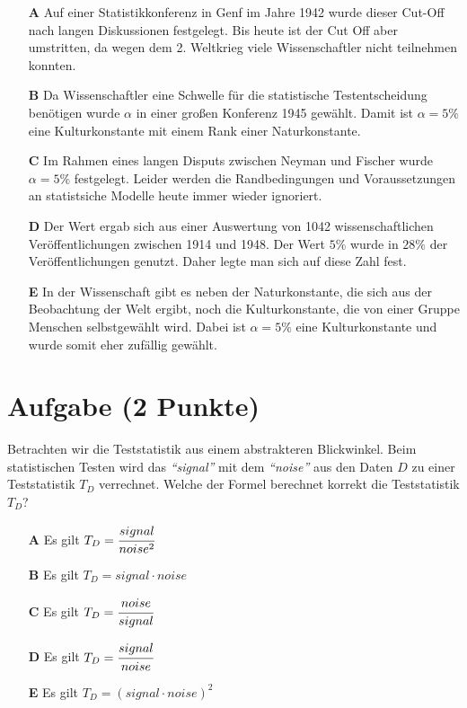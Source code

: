 \documentclass[a4paper, 9pt]{scrartcl}\usepackage[]{graphicx}\usepackage[]{xcolor}
\begin{document}
\begin{enumerate}
\item [\textbf{A} \msquare] Auf einer Statistikkonferenz in Genf im Jahre 1942 wurde dieser Cut-Off nach langen Diskussionen festgelegt. Bis heute ist der Cut Off aber umstritten, da wegen dem 2. Weltkrieg viele Wissenschaftler nicht teilnehmen konnten.
\item [\textbf{B} \msquare] Da Wissenschaftler eine Schwelle für die statistische Testentscheidung benötigen wurde $\alpha$ in einer großen Konferenz 1945 gewählt. Damit ist $\alpha = 5\%$ eine Kulturkonstante mit einem Rank einer Naturkonstante.
\item [\textbf{C} \msquare] Im Rahmen eines langen Disputs zwischen Neyman und Fischer wurde $\alpha = 5\%$ festgelegt. Leider werden die Randbedingungen und Voraussetzungen an statistsiche Modelle heute immer wieder ignoriert.
\item [\textbf{D} \msquare] Der Wert ergab sich aus einer Auswertung von 1042 wissenschaftlichen Veröffentlichungen zwischen 1914 und 1948. Der Wert $5\%$ wurde in $28\%$ der Veröffentlichungen genutzt. Daher legte man sich auf diese Zahl fest.
\item [\textbf{E} \msquare] In der Wissenschaft gibt es neben der Naturkonstante, die sich aus der Beobachtung der Welt ergibt, noch die Kulturkonstante, die von einer Gruppe Menschen selbstgewählt wird. Dabei ist $\alpha = 5\%$ eine Kulturkonstante und wurde somit eher zufällig gewählt.
\end{enumerate}

\section{Aufgabe \hfill (2 Punkte)}

Betrachten wir die Teststatistik aus einem abstrakteren Blickwinkel. Beim
statistischen Testen wird das \textit{"`signal"'} mit dem
\textit{"`noise"'} aus den Daten $D$ zu einer Teststatistik $T_D$ verrechnet. Welche der Formel
berechnet korrekt die Teststatistik $T_D$?



\begin{enumerate}
\item [\textbf{A} \msquare] Es gilt $T_D = \cfrac{signal}{noise^2}$
\item [\textbf{B} \msquare] Es gilt $T_D = signal \cdot noise$
\item [\textbf{C} \msquare] Es gilt $T_D = \cfrac{noise}{signal}$
\item [\textbf{D} \msquare] Es gilt $T_D = \cfrac{signal}{noise}$
\item [\textbf{E} \msquare] Es gilt $T_D = (signal \cdot noise)^2$
\end{enumerate}
\end{document}
